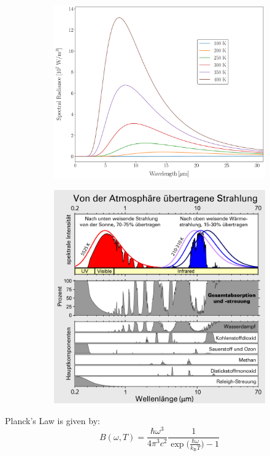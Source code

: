 \documentclass[9pt]{report}
\begin{document}
\begin{figure}[H]
	\centering
	\begin{subfigure}[b]{0.53\textwidth}  
		\centering 
		\includegraphics[width=\textwidth]{Planck-Strahlungsgesetz.pdf}  
	\end{subfigure}
	\hfill
	\begin{subfigure}[b]{0.43\textwidth}
		\centering
		\includegraphics[width=\textwidth]{Atmospheric_Transmission.png}
	\end{subfigure}
\end{figure}
Planck's Law is given by:
\begin{equation}
B(\omega,T)=\frac{\hbar \omega^3}{4\pi^3 c^2}\frac{1}{\displaystyle\exp\Big(\frac{\hbar\omega}{k_{\mathrm{B}}T}\Big)-1}
\end{equation}
\end{document}
